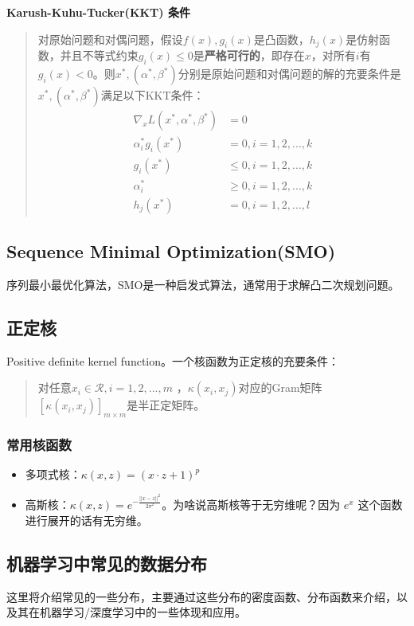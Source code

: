 \textbf{Karush-Kuhu-Tucker(KKT) 条件}\label{kkt}
\begin{quotation}
	对原始问题和对偶问题，假设$f(x), g_i(x)$是凸函数，$h_j(x)$是仿射函数，并且不等式约束$g_i(x) \leq 0$是\textbf{严格可行的}，即存在$x$，对所有$i$有$g_i(x) < 0$。则$x^*, (\alpha^*, \beta^*)$分别是原始问题和对偶问题的解的充要条件是$x^*, (\alpha^*, \beta^*)$满足以下KKT条件：
	\begin{align}\nonumber
		\nabla_x L(x^*, \alpha^*, \beta^*) &= 0 \nonumber \\
		\alpha_i^* g_i(x^*) &= 0, i = 1, 2, ..., k \nonumber \\
		g_i(x^*) &\leq 0, i = 1, 2, ..., k \nonumber \\
		\alpha_i^* &\geq 0, i = 1, 2, ..., k \nonumber \\ 
		h_j(x^*) &= 0, i = 1, 2, ..., l \nonumber 
	\end{align}
	
\end{quotation}

\subsection{Sequence Minimal Optimization(SMO)}\label{smo}
序列最小最优化算法，SMO是一种启发式算法，通常用于求解凸二次规划问题。

\subsection{正定核}\label{pdkf}
Positive definite kernel function。一个核函数为正定核的充要条件：
\begin{quotation}
	对任意$x_i \in \mathcal{R}, i = 1, 2, ..., m$ ，$\kappa(x_i, x_j)$对应的Gram矩阵 $[\kappa(x_i, x_j)]_{m \times m}$是半正定矩阵。
\end{quotation}

\subsubsection{常用核函数}
\begin{itemize}
	\item 多项式核：$\kappa(x, z) = (x \cdot z + 1)^p$
	\item 高斯核：$\kappa(x, z) = e^{- \frac{||x - z||^2}{2 \sigma^2}}$。为啥说高斯核等于无穷维呢？因为 $e^x$ 这个函数进行展开的话有无穷维。
\end{itemize}


\subsection{机器学习中常见的数据分布}
这里将介绍常见的一些分布，主要通过这些分布的密度函数、分布函数来介绍，以及其在机器学习/深度学习中的一些体现和应用。
